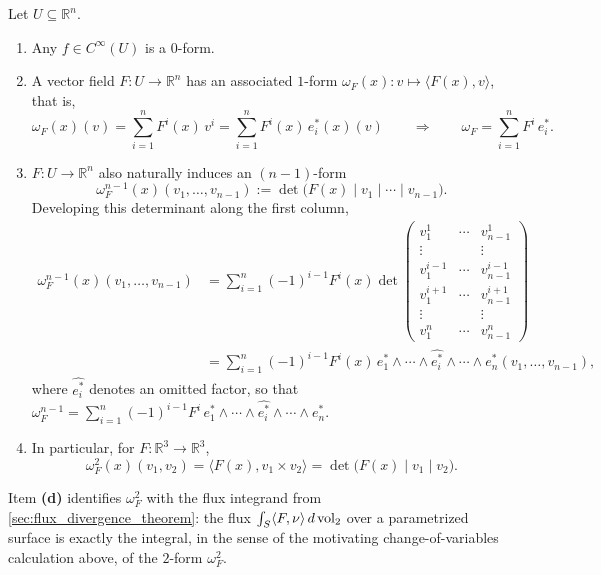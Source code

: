 \begin{example}
Let $U \subseteq \mathbb{R}^n$.
\begin{enumerate}[label=\textbf{(\alph*)}]
  \item Any $f \in C^\infty(U)$ is a $0$-form.
  \item A vector field $F : U \to \mathbb{R}^n$ has an associated $1$-form $\omega_F(x) : v
  \mapsto \langle F(x),v\rangle$, that is,
  \[\omega_F(x)(v) = \sum_{i=1}^n F^i(x)\,v^i = \sum_{i=1}^n F^i(x)\,e_i^*(x)(v)
    \qquad\Longrightarrow\qquad \omega_F = \sum_{i=1}^n F^i\,e_i^*.\]
  \item $F : U \to \mathbb{R}^n$ also naturally induces an $(n-1)$-form
  \[\omega_F^{n-1}(x)(v_1,\ldots,v_{n-1}) := \det\big(F(x)\mid v_1\mid\cdots\mid v_{n-1}\big).\]
  Developing this determinant along the first column,
  \begin{align}
  \omega_F^{n-1}(x)(v_1,\ldots,v_{n-1}) &= \sum_{i=1}^n (-1)^{i-1}F^i(x)\det\!\left(
    \begin{smallmatrix} v_1^1 & \cdots & v_{n-1}^1 \\ \vdots & & \vdots \\ v_1^{i-1} & \cdots &
    v_{n-1}^{i-1} \\ v_1^{i+1} & \cdots & v_{n-1}^{i+1} \\ \vdots & & \vdots \\ v_1^n &
    \cdots & v_{n-1}^n \end{smallmatrix}\right) \nonumber \\
    &= \sum_{i=1}^n (-1)^{i-1}F^i(x)\,e_1^*\wedge\cdots\wedge\widehat{e_i^*}\wedge\cdots\wedge
    e_n^*(v_1,\ldots,v_{n-1}), \nonumber
  \end{align}
  where $\widehat{e_i^*}$ denotes an omitted factor, so that $\omega_F^{n-1} =
  \sum_{i=1}^n (-1)^{i-1}F^i\,e_1^*\wedge\cdots\wedge\widehat{e_i^*}\wedge\cdots\wedge e_n^*$.
  \item In particular, for $F : \mathbb{R}^3 \to \mathbb{R}^3$,
  \[\omega_F^2(x)(v_1,v_2) = \langle F(x),v_1\times v_2\rangle = \det\big(F(x)\mid v_1\mid
    v_2\big).\]
\end{enumerate}
\end{example}

\begin{ainote}
Item \textbf{(d)} identifies $\omega_F^2$ with the flux integrand from
\cref{sec:flux_divergence_theorem}: the flux $\int_S \langle F,\nu\rangle\,d\operatorname{vol}_2$ over a parametrized surface is
exactly the integral, in the sense of the motivating change-of-variables calculation above, of
the $2$-form $\omega_F^2$.
\end{ainote}

